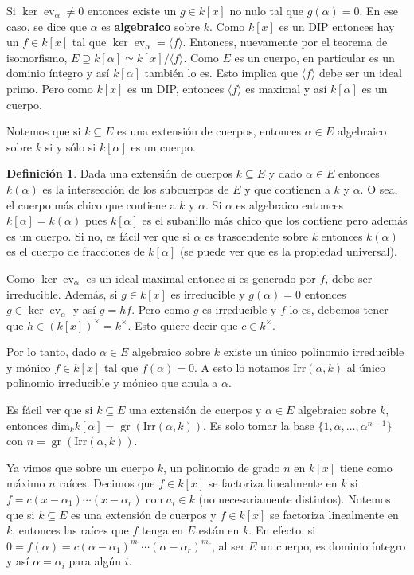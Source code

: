 \documentclass[12pt]{book}
\theoremstyle{definition}
\newtheorem{defn}[teo]{Definición}
\DeclareMathOperator{\gr}{gr}
\DeclareMathOperator{\ev}{ev}
\begin{document}
Si $\ker\ev_\alpha\neq 0$ entonces existe un $g\in k[x]$ no nulo tal que $g(\alpha)=0$. En ese caso, se dice que $\alpha$ es \textbf{algebraico} sobre $k$. Como $k[x]$ es un DIP entonces hay un $f\in k[x]$ tal que $\ker\ev_\alpha = \langle f\rangle$. Entonces, nuevamente por el teorema de isomorfismo, $E\supseteq k[\alpha]\simeq k[x]/\langle f\rangle$. Como $E$ es un cuerpo, en particular es un dominio íntegro y así $k[\alpha]$ también lo es. Esto implica que $\langle f\rangle$ debe ser un ideal primo. Pero como $k[x]$ es un DIP, entonces $\langle f\rangle$ es maximal y así $k[\alpha]$ es un cuerpo.

Notemos que si $k\subseteq E$ es una extensión de cuerpos, entonces $\alpha\in E$ algebraico sobre $k$ si y sólo si $k[\alpha]$ es un cuerpo.

\begin{defn}
Dada una extensión de cuerpos $k\subseteq E$ y dado $\alpha\in E$ entonces $k(\alpha)$ es la intersección de los subcuerpos de $E$ y que contienen a $k$ y $\alpha$. O sea, el cuerpo más chico que contiene a $k$ y $\alpha$. Si $\alpha$ es algebraico entonces $k[\alpha]=k(\alpha)$ pues $k[\alpha]$ es el subanillo más chico que los contiene pero además es un cuerpo. Si no, es fácil ver que si $\alpha$ es trascendente sobre $k$ entonces $k(\alpha)$ es el cuerpo de fracciones de $k[\alpha]$ (se puede ver que es la propiedad universal).
\end{defn}

Como $\ker\ev_\alpha$ es un ideal maximal entonce si es generado por $f$, debe ser irreducible. Además, si $g\in k[x]$ es irreducible y $g(\alpha)=0$ entonces $g\in\ker\ev_\alpha$ y así $g=hf$. Pero como $g$ es irreducible y $f$ lo es, debemos tener que $h\in (k[x])^\times = k^\times$. Esto quiere decir que $c\in k^\times$.

Por lo tanto, dado $\alpha\in E$ algebraico sobre $k$ existe un único polinomio irreducible y mónico $f\in k[x]$ tal que $f(\alpha)=0$. A esto lo notamos $\mathrm{Irr}(\alpha,k)$ al único polinomio irreducible y mónico que anula a $\alpha$.

Es fácil ver que si $k\subseteq E$ una extensión de cuerpos y $\alpha\in E$ algebraico sobre $k$, entonces $\mathrm{dim}_k k[\alpha] = \gr (\mathrm{Irr}(\alpha,k))$. Es solo tomar la base $\{1,\alpha,\ldots , \alpha^{n-1}\}$ con $n=\gr(\mathrm{Irr}(\alpha,k))$.

Ya vimos que sobre un cuerpo $k$, un polinomio de grado $n$ en $k[x]$ tiene como máximo $n$ raíces. Decimos que $f\in k[x]$ se factoriza linealmente en $k$ si $f=c(x-\alpha_1)\cdots (x-\alpha_r)$ con $a_i\in k$ (no necesariamente distintos). Notemos que si $k\subseteq E$ es una extensión de cuerpos y $f\in k[x]$ se factoriza linealmente en $k$, entonces las raíces que $f$ tenga en $E$ están en $k$. En efecto, si $0=f(\alpha) = c(\alpha-\alpha_1)^{m_1}\cdots (\alpha-\alpha_r)^{m_r}$, al ser $E$ un cuerpo, es dominio íntegro y así $\alpha = \alpha_i$ para algún $i$.
\end{document}
